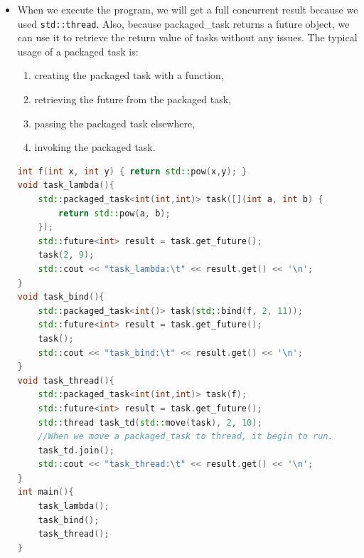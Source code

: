 \documentclass[a4paper,11pt,twoside]{book}
\begin{document}
\begin{itemize}
\begin{enumerate}
	\item Also, a \texttt{packaged\_task} needs to be invoked before you call \texttt{future.get()}, otherwise you program will freeze as the future will never become ready:
	
	\item A \texttt{packaged\_task} won't start on it's own, you have to invoke it. On the other hand, \texttt{std::async} with \texttt{launch::async} will try to run the task in a different thread. Use \texttt{std::async} if you want some things done and don't really care when they're done, and \texttt{std::packaged\_task} if you want to wrap up things in order to move them to other threads or call them later.
\end{enumerate}

    \item When we execute the program, we will get a full concurrent result because we used \texttt{std::thread}. Also, because packaged\_task returns a future object, we can use it to retrieve the return value of tasks without any issues. The typical usage of a packaged task is:

\begin{enumerate}
	\item creating the packaged task with a function,
	\item retrieving the future from the packaged task,
	\item passing the packaged task elsewhere,
	\item invoking the packaged task.
\end{enumerate}

\begin{lstlisting}[frame=single, language=c++]
int f(int x, int y) { return std::pow(x,y); }
void task_lambda(){
	std::packaged_task<int(int,int)> task([](int a, int b) {
		return std::pow(a, b); 
	});
	std::future<int> result = task.get_future();
	task(2, 9);
	std::cout << "task_lambda:\t" << result.get() << '\n';
}
void task_bind(){
	std::packaged_task<int()> task(std::bind(f, 2, 11));
	std::future<int> result = task.get_future();
	task();
	std::cout << "task_bind:\t" << result.get() << '\n';
}
void task_thread(){
	std::packaged_task<int(int,int)> task(f);
	std::future<int> result = task.get_future();
	std::thread task_td(std::move(task), 2, 10);
    //When we move a packaged_task to thread, it begin to run.
	task_td.join();
	std::cout << "task_thread:\t" << result.get() << '\n';
}
int main(){
	task_lambda();
	task_bind();
	task_thread();
}
\end{lstlisting}


\end{itemize}
\end{document}
